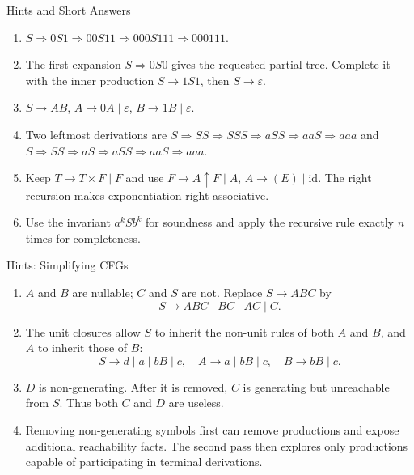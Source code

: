 \documentclass[10pt]{beamer}
\begin{document}
\begin{frame}{Hints and Short Answers}
  \small
  \begin{enumerate}
    \item $S\Rightarrow0S1\Rightarrow00S11\Rightarrow000S111\Rightarrow000111$.
    \item The first expansion $S\Rightarrow0S0$ gives the requested partial
      tree. Complete it with the inner production $S\to1S1$, then
      $S\to\varepsilon$.
    \item $S\to AB$, $A\to0A\mid\varepsilon$, $B\to1B\mid\varepsilon$.
    \item Two leftmost derivations are
      $S\Rightarrow SS\Rightarrow SSS\Rightarrow aSS\Rightarrow aaS\Rightarrow aaa$
      and
      $S\Rightarrow SS\Rightarrow aS\Rightarrow aSS\Rightarrow aaS\Rightarrow aaa$.
    \item Keep $T\to T\times F\mid F$ and use
      $F\to A\mathbin{\uparrow}F\mid A$, $A\to(E)\mid\mathrm{id}$.
      The right recursion makes exponentiation right-associative.
    \item Use the invariant $a^kSb^k$ for soundness and apply the recursive rule exactly $n$ times
      for completeness.
  \end{enumerate}
\end{frame}

\begin{frame}{Hints: Simplifying CFGs}
  \small
  \begin{enumerate}
    \item $A$ and $B$ are nullable; $C$ and $S$ are not. Replace
      $S\to ABC$ by
      \[
        S\to ABC\mid BC\mid AC\mid C.
      \]
    \item The unit closures allow $S$ to inherit the non-unit rules of both
      $A$ and $B$, and $A$ to inherit those of $B$:
      \[
        S\to d\mid a\mid bB\mid c,\quad
        A\to a\mid bB\mid c,\quad B\to bB\mid c.
      \]
    \item $D$ is non-generating. After it is removed, $C$ is generating but
      unreachable from $S$. Thus both $C$ and $D$ are useless.
    \item Removing non-generating symbols first can remove productions and
      expose additional reachability facts. The second pass then explores only
      productions capable of participating in terminal derivations.
  \end{enumerate}
\end{frame}
\end{document}
